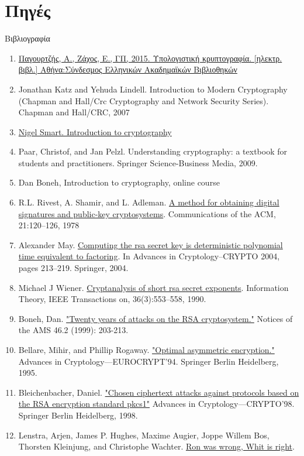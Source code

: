 \documentclass[handout]{beamer}
\begin{document}
\section{Πηγές}
\begin{frame}{Βιβλιογραφία}
\begin{tiny}
\begin{enumerate}
\item \href{http://hdl.handle.net/11419/5439}{Παγουρτζής, Α., Ζάχος, Ε., ΓΠ, 2015. Υπολογιστική κρυπτογραφία. [ηλεκτρ. βιβλ.] Αθήνα:Σύνδεσμος Ελληνικών Ακαδημαϊκών Βιβλιοθηκών}
\item Jonathan Katz and Yehuda Lindell. Introduction to Modern Cryptography (Chapman and Hall/Crc Cryptography and Network Security Series). Chapman
and Hall/CRC, 2007
\item \href{http://goo.gl/b75I29}{Nigel Smart. Introduction to cryptography} 
\item Paar, Christof, and Jan Pelzl. Understanding cryptography: a textbook for students and practitioners. Springer Science-Business Media, 2009.
\item Dan Boneh, Introduction to cryptography, online course
\medskip
\item R.L. Rivest, A. Shamir, and L. Adleman. \href{https://people.csail.mit.edu/rivest/Rsapaper.pdf}{A method for obtaining digital signatures and public-key cryptosystems}. Communications of the ACM,
21:120–126, 1978
\item  Alexander May. \href{https://www.iacr.org/archive/crypto2004/31520213/det.pdf}{Computing the rsa secret key is deterministic polynomial time equivalent to factoring}. In Advances in Cryptology–CRYPTO 2004,
pages 213–219. Springer, 2004.
\item Michael J Wiener. \href{http://igm.univ-mlv.fr/~jyt/Crypto/4/10.1.1.92.5261.pdf}{Cryptanalysis of short rsa secret exponents}. Information Theory, IEEE Transactions on, 36(3):553–558, 1990.
\item Boneh, Dan. \href{http://www.ams.org/notices/199902/boneh.pdf}{"Twenty years of attacks on the RSA cryptosystem."} Notices of the AMS 46.2 (1999): 203-213.
\item Bellare, Mihir, and Phillip Rogaway. \href{https://cseweb.ucsd.edu/~mihir/papers/oae.pdf}{"Optimal asymmetric encryption."} Advances in Cryptology—EUROCRYPT'94. Springer Berlin Heidelberg, 1995.
\item Bleichenbacher, Daniel. \href{http://archiv.infsec.ethz.ch/education/fs08/secsem/Bleichenbacher98.pdf}{"Chosen ciphertext attacks against protocols based on the RSA encryption standard pkcs1"} Advances in Cryptology—CRYPTO'98. Springer Berlin Heidelberg, 1998.
\item Lenstra, Arjen, James P. Hughes, Maxime Augier, Joppe Willem Bos, Thorsten Kleinjung, and Christophe Wachter. \href{https://eprint.iacr.org/2012/064.pdf}{Ron was wrong, Whit is right}.
\end{enumerate}
\end{tiny}
\end{frame}

 
\end{document}
